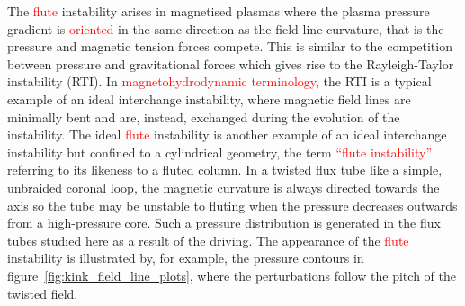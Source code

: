 \documentclass[12pt]{article}
\newcommand{\rs}[2]{\textcolor{red}{#2}}
\begin{document}
The \rs{fluting}{flute} instability arises in magnetised plasmas where
the plasma pressure gradient is \rs{directed}{oriented} in the same direction as the
field line curvature, that is the pressure and magnetic tension forces
compete. This is similar to the competition between pressure and
gravitational forces which gives rise to the Rayleigh-Taylor
instability (RTI). In \rs{MHD}{magnetohydrodynamic terminology}, the RTI is a typical example of an ideal
interchange instability, where magnetic field lines are minimally bent
and are, instead, exchanged during the evolution of the
instability. The ideal \rs{fluting}{flute} instability is another example of an
ideal interchange instability but confined to a cylindrical geometry,
the term \rs{``fluting instability''}{``flute instability''} referring to its likeness to a fluted
column. In a twisted flux tube like a simple, unbraided coronal loop,
the magnetic curvature is always directed towards the axis so the tube
may be unstable to fluting when the pressure decreases outwards from a
high-pressure core. Such a pressure distribution is generated in the
flux tubes studied here as a result of the driving. The appearance of
the \rs{fluting}{flute} instability is illustrated by, for example, the pressure
contours in figure~\ref{fig:kink_field_line_plots}, where the
perturbations follow the pitch of the twisted field. 
\end{document}
